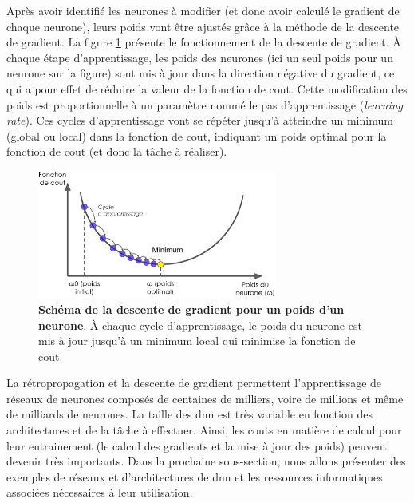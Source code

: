 Après avoir identifié les neurones à modifier (et donc avoir calculé le gradient de chaque neurone), leurs poids vont être ajustés grâce à la méthode de la descente de gradient. La figure \ref{fig:grad_descent} présente le fonctionnement de la descente de gradient. À chaque étape d'apprentissage, les poids des neurones (ici un seul poids pour un neurone sur la figure) sont mis à jour dans la direction négative du gradient, ce qui a pour effet de réduire la valeur de la fonction de cout. Cette modification des poids est proportionnelle à un paramètre nommé le pas d'apprentissage (\textit{learning rate}). Ces cycles d'apprentissage vont se répéter jusqu'à atteindre un minimum (global ou local) dans la fonction de cout, indiquant un poids optimal pour la fonction de cout (et donc la tâche à réaliser).
\begin{figure}[!ht]
 \centering
 \includegraphics[width=0.7\textwidth]{figures/gradient_descent.png}
 \caption[Schéma de la descente de gradient pour un poids d'un neurone]{\textbf{Schéma de la descente de gradient pour un poids d'un neurone}. À chaque cycle d'apprentissage, le poids du neurone est mis à jour jusqu'à un minimum local qui minimise la fonction de cout.}
 \label{fig:grad_descent}
\end{figure}


La rétropropagation et la descente de gradient permettent l'apprentissage de réseaux de neurones composés de centaines de milliers, voire de millions et même de milliards de neurones. La taille des \gls{dnn} est très variable en fonction des architectures et de la tâche à effectuer. Ainsi, les couts en matière de calcul pour leur entrainement (le calcul des gradients et la mise à jour des poids) peuvent devenir très importants. Dans la prochaine sous-section, nous allons présenter des exemples de réseaux et d'architectures de \gls{dnn} et les ressources informatiques associées nécessaires à leur utilisation.

